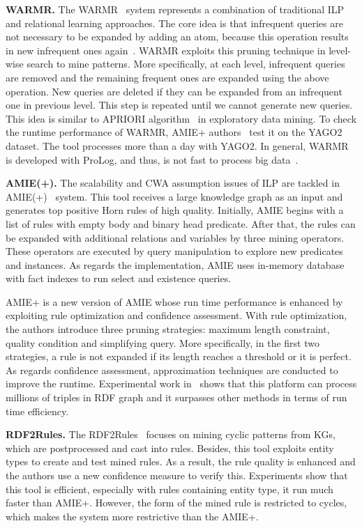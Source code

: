 \textbf{WARMR.} The WARMR~\cite{ref16, ref17} system represents a combination of traditional ILP and relational learning approaches. The core idea is that infrequent queries are not necessary to be expanded by adding an atom, because this operation results in new infrequent ones again~\cite{ref17}. WARMR exploits this pruning technique in level-wise search to mine patterns. More specifically, at each level, infrequent queries are removed and the remaining frequent ones are expanded using the above operation. New queries are deleted if they can be expanded from an infrequent one in previous level. This step is repeated until we cannot generate new queries. This idea is similar to APRIORI algorithm~\cite{ref44} in exploratory data mining. To check the runtime performance of WARMR, AMIE+ authors~\cite{ref10} test it on the YAGO2 dataset. The tool processes more than a day with YAGO2. In general, WARMR is developed with ProLog, and thus, is not fast to process big data~\cite{ref10}.

\textbf{AMIE(+).} The scalability and CWA assumption issues of ILP are tackled in AMIE(+)~\cite{ref10} system. This tool receives a large knowledge graph as an input and generates top positive Horn rules of high quality. Initially, AMIE begins with a list of rules with empty body and binary head predicate. After that, the rules can be expanded with additional relations and variables by three mining operators. These operators are executed by query manipulation to explore new predicates and instances. As regards the implementation, AMIE uses in-memory database with fact indexes to run select and existence queries.

AMIE+ is a new version of AMIE whose run time performance is enhanced by exploiting rule optimization and confidence assessment. With rule optimization, the authors introduce three pruning strategies: maximum length constraint, quality condition and simplifying query. More specifically, in the first two strategies, a rule is not expanded if its length reaches a threshold or it is perfect. As regards confidence assessment, approximation techniques are conducted to improve the runtime. Experimental work in~\cite{ref10} shows that this platform can process millions of triples in RDF graph and it surpasses other methods in terms of run time efficiency.

\textbf{RDF2Rules.} The RDF2Rules~\cite{ref29} focuses on mining cyclic patterns from KGs, which are postprocessed and cast into rules. Besides, this tool exploits entity types to create and test mined rules. As a result, the rule quality is enhanced and the authors use a new confidence measure to verify this. Experiments show that this tool is efficient, especially with rules containing entity type, it run much faster than AMIE+. However, the form of the mined rule is restricted to cycles, which makes the system more restrictive than the AMIE+.

